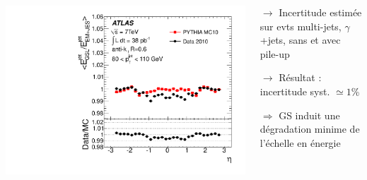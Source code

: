 \begin{frame}
\vspace*{-0.5cm}
\begin{columns}
\begin{column}{0.3\textwidth}
\vspace{-0.5cm}
\begin{center}
\includegraphics[width=1.2\textwidth]{Figures/JES/fig_51c.pdf}
\end{center}
\end{column}
\begin{column}{0.6\textwidth}
\begin{maliste}
\item[$\rightarrow$] Incertitude estim\'ee sur evts multi-jets, $\gamma$+jets, sans et avec pile-up
\vspace*{0.3cm}
\item[$\rightarrow$] R\'esultat : incertitude syst. $\simeq 1$\%
\vspace*{0.3cm}
\item[$\Rightarrow$] GS induit une d\'egradation minime de l'\'echelle en \'energie
\end{maliste}
\end{column}
\end{columns}
\end{frame}

